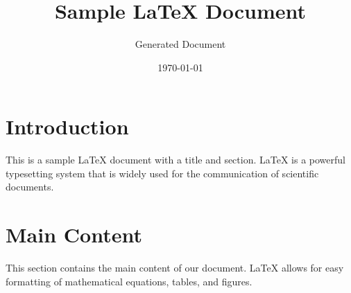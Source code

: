 \documentclass{article}
\title{Sample LaTeX Document}
\author{Generated Document}
\date{\today}
\begin{document}
\maketitle

\section{Introduction}
This is a sample LaTeX document with a title and section. LaTeX is a powerful typesetting system that is widely used for the communication of scientific documents.

\section{Main Content}
This section contains the main content of our document. LaTeX allows for easy formatting of mathematical equations, tables, and figures.
\end{document}
